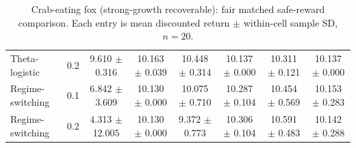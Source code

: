 \documentclass[10pt]{article}
\begin{document}
\begin{table}[p]
\begin{tabular}{@{}lc*{6}{c}@{}}
Theta-logistic & 0.2 & \shortstack{9.610\\$\pm$ 0.316} & \shortstack{10.163\\$\pm$ 0.039} & \shortstack{10.448\\$\pm$ 0.314} & \shortstack{10.137\\$\pm$ 0.000} & \shortstack{10.311\\$\pm$ 0.121} & \shortstack{10.137\\$\pm$ 0.000} \\
\addlinespace[1.5pt]
Regime-switching & 0.1 & \shortstack{6.842\\$\pm$ 3.609} & \shortstack{10.130\\$\pm$ 0.000} & \shortstack{10.075\\$\pm$ 0.710} & \shortstack{10.287\\$\pm$ 0.104} & \shortstack{10.454\\$\pm$ 0.569} & \shortstack{10.153\\$\pm$ 0.283} \\
Regime-switching & 0.2 & \shortstack{4.313\\$\pm$ 12.005} & \shortstack{10.130\\$\pm$ 0.000} & \shortstack{9.372\\$\pm$ 0.773} & \shortstack{10.306\\$\pm$ 0.104} & \shortstack{10.591\\$\pm$ 0.483} & \shortstack{10.142\\$\pm$ 0.288} \\
\bottomrule
\end{tabular}
\caption{Crab-eating fox (strong-growth recoverable): fair matched safe-reward comparison. Each entry is mean discounted return $\pm$ within-cell sample SD, $n=20$.}
\end{table}
\end{document}
